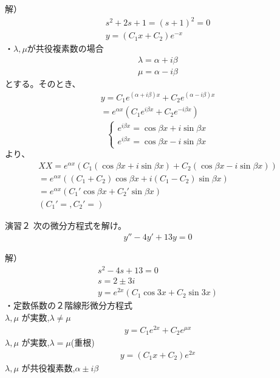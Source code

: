\documentclass{jsarticle}
\begin{document}
解）
\begin{eqnarray}
s^2+2s+1=(s+1)^2=0\\
y=(C_1x+C_2)e^{-x}
\end{eqnarray}
・$\lambda,\mu$が共役複素数の場合
\begin{eqnarray}
\lambda = \alpha+i\beta\\
\mu=\alpha -i\beta
\end{eqnarray}
とする。そのとき、
\begin{eqnarray}
y=C_1e^{(\alpha+i\beta)x}+C_2e^{(\alpha -i\beta)x}\\
=e^{\alpha x}(C_1e^{i\beta x}+C_2e^{-i\beta x})
\end{eqnarray}
\begin{displaymath}
\left\{
\begin{array}{l}
e^{i\beta x}=\cos \beta x + i\sin \beta x  \\
e^{i\beta x}=\cos \beta x - i\sin \beta x
\end{array}
\right.
\end{displaymath}
より、
\begin{eqnarray}
XX=e^{\alpha x}(C_1(\cos \beta x + i\sin \beta x)+C_2(\cos \beta x-i\sin \beta x))\\
=e^{\alpha x}((C_1+C_2)\cos \beta x+i(C_1-C_2)\sin \beta x)\\
=e^{\alpha x}(C_1'\cos \beta x+C_2'\sin \beta x)\\
(C_1'=,C_2'=)
\end{eqnarray}
\begin{itembox}[l]{演習２}
次の微分方程式を解け。
\begin{eqnarray}
y''-4y'+13y=0
\end{eqnarray}
\end{itembox}
解）
\begin{eqnarray}
s^2-4s+13=0\\
s=2\pm 3i\\
y=e^{2x}(C_1\cos 3x+C_2 \sin 3x)
\end{eqnarray}
・定数係数の２階線形微分方程式\\
\quad $\lambda , \mu$ が実数,$\lambda \neq \mu$\\
\begin{eqnarray}
y=C_1e^{2x}+C_2e^{\mu x}
\end{eqnarray}
\quad $\lambda , \mu$ が実数,$\lambda = \mu$(重根)\\
\begin{eqnarray}
y=(C_1x+C_2)e^{2x}
\end{eqnarray}
\quad $\lambda , \mu$ が共役複素数,$\alpha \pm i\beta$
\end{document}
